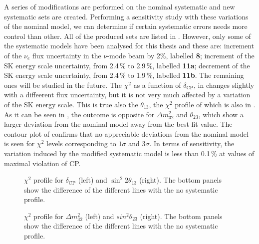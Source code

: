 A series of modifications are performed on the nominal systematic and new systematic sets are created.
Performing a sensitivity study with these variations of the nominal model, we can determine %
if certain systematic errors needs more control than other.
All of the produced sets are listed in .
However, only some of the systematic models have been analysed for this thesis and these are:
increment of the $\nu_e$ flux uncertainty in the $\nu$-mode beam by 2\%, labelled \textbf{8}; %
increment of the SK energy scale uncertainty, from 2.4\,\% to 2.9\,\%, labelled \textbf{11a}; %
decrement of the SK energy scale uncertainty, from 2.4\,\% to 1.9\,\%, labelled \textbf{11b}.
The remaining ones will be studied in the future.
The $\chi^2$ as a function of $\delta_\text{CP}$, in  changes slightly with a diffeerent flux uncertainty, %
but it is not very much affected by a variation of the SK energy scale.
This is true also the $\theta_{13}$, the $\chi^2$ profile of which is also in .
As it can be seen in , the outcome is opposite for %
$\Delta m_{32}^2$ and $\theta_{23}$, which show a larger deviation from the nominal %
model away from the best fit value.
The contour plot of  confirms that no appreciable deviations from the nominal model %
is seen for $\chi^2$ levels corresponding to $1\sigma$ and $3\sigma$.
In terms of sensitivity, the variation induced by the modified systematic model is %
less than 0.1\,\% at values of maximal violation of CP.

\begin{figure}
	\centering
	\resizebox{0.48\linewidth}{!}{}
	\resizebox{0.48\linewidth}{!}{}
	\caption{$\chi^2$ profile for $\delta_\text{CP}$ (left) and $\sin^2 2\theta_{13}$ (right). 
		The bottom panels show the difference of the different lines with the no systematic profile.}
	\label{fig:0_11a_11b_8_dCP_S13}
\end{figure}

\begin{figure}
	\centering
	\resizebox{0.48\linewidth}{!}{}
	\resizebox{0.48\linewidth}{!}{}
	\caption{$\chi^2$ profile for $\Delta m_{32}^2$ (left) and $sin^2 \theta_{23}$ (right). 
		The bottom panels show the difference of the different lines with the no systematic profile.}
	\label{fig:0_11a_11b_8_M23_S23}
\end{figure}


